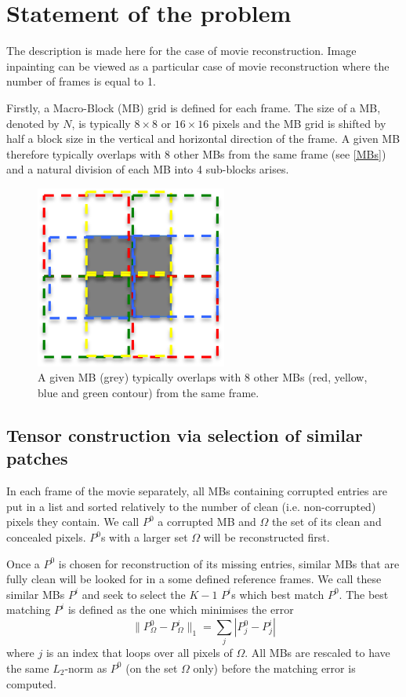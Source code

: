 \documentclass[a4paper, 11pt]{article} %
\def \bee {\begin{equation}}
\def \eee {\end{equation}}
\def \t {\times}
\begin{document}
\section{Statement of the problem}
The description is made here for the case of movie reconstruction. Image inpainting can be viewed as a particular case of movie reconstruction where the number of frames is equal to 1.

Firstly, a Macro-Block (MB) grid is defined for each frame. The size of a MB, denoted by $N$, is typically  $8\t 8$ or $16\t 16$ pixels and the MB grid is shifted by half a block size in the vertical and horizontal direction of the frame. A given MB therefore typically overlaps with 8 other MBs from the same frame (see \autoref{MBs}) and a natural division of each MB into 4 sub-blocks arises. 

\begin{figure}[h!]
\centering
\includegraphics[scale=0.6]{MBs}
\caption{A given MB (grey) typically overlaps with 8 other MBs (red, yellow, blue and green contour) from the same frame.  \label{MBs}}
\end{figure}
\subsection{Tensor construction via selection of similar patches}

In each frame of the movie separately, all MBs containing corrupted entries are put in a list and sorted relatively to the number of clean (i.e. non-corrupted) pixels they contain.
We call $P^0$ a corrupted MB and $\Omega$ the set of its clean and concealed pixels.
$P^0$s with a larger set $\Omega$ will be reconstructed first.

Once a $P^0$ is chosen for reconstruction of its missing entries, similar MBs that are fully clean will be looked for in a some defined reference frames. We call these similar MBs $P^i$ and seek to select the $K-1$  $P^i$s which best match $P^0$. The best matching $P^i$ is defined as the one which minimises the error
\bee
\| P_{\Omega}^0-P_{\Omega}^i\|_1=\sum \limits_{j} |P^0_j-P^i_j|
\label{ErrorMatching}
\eee
where $j$ is an index that loops over all pixels of $\Omega$. All MBs are rescaled to have the same $L_2$-norm as $P^0$ (on the set $\Omega$ only) before the matching error is computed. 
\end{document}
